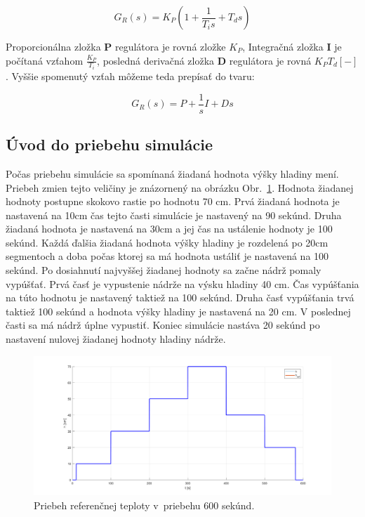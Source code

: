 \documentclass{article}
\begin{document}
$$ G_R(s) = K_P \left( 1 + \frac{1}{T_is} + T_ds \right) $$

Proporcionálna zložka \textbf{P} regulátora je rovná zložke $K_P$, Integračná zložka \textbf{I} je počítaná vzťahom
$\frac{K_P}{T_i}$, posledná derivačná zložka \textbf{D} regulátora je rovná $K_P T_d [-]$.
Vyššie spomenutý vzťah môžeme teda prepísať do tvaru:

$$ G_R(s) = P  + \frac{1}{s}I + Ds $$

\clearpage

\subsection{Úvod do priebehu simulácie}
\label{subsec:priebehSimulacie}

Počas priebehu simulácie sa spomínaná žiadaná hodnota výšky hladiny mení. Priebeh zmien tejto veličiny je znázornený
na obrázku Obr.~\ref{fig:ziadanaHodnota}. Hodnota žiadanej hodnoty postupne skokovo rastie po hodnotu 70 cm. Prvá
žiadaná hodnota je nastavená na 10cm čas tejto časti simulácie je nastavený na 90 sekúnd. Druha žiadaná hodnota
je nastavená na 30cm a jej čas na ustálenie hodnoty je 100 sekúnd. Každá ďalšia žiadaná hodnota výšky hladiny
je rozdelená po 20cm segmentoch a doba počas ktorej sa má hodnota ustáliť je nastavená na 100 sekúnd. Po dosiahnutí
najvyššej žiadanej hodnoty sa začne nádrž pomaly vypúšťať. Prvá časť je vypustenie nádrže na výsku hladiny 40 cm.
Čas vypúšťania na túto hodnotu je nastavený taktiež na 100 sekúnd. Druha časť vypúšťania trvá taktiež 100 sekúnd
a hodnota výšky hladiny je nastavená na 20 cm. V poslednej časti sa má nádrž úplne vypustiť. Koniec simulácie nastáva
20 sekúnd po nastavení nulovej žiadanej hodnoty hladiny nádrže.

\begin{figure}[!htbp]
	\begin{center}
		\includegraphics[width=\textwidth]{./include/ziadana_hodnota.png}
		\caption{Priebeh referenčnej teploty v~priebehu 600 sekúnd.}
		\label{fig:ziadanaHodnota}
	\end{center}
	\hfill
\end{figure}
\end{document}
